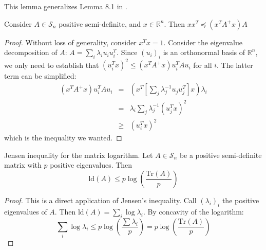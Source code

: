 This lemma generalizes Lemma 8.1 in \cite{Spielman2009a}.
\begin{lemma}
\label{lem:simple-inequality}Consider $A\in\mathcal{S}_{n}$ positive
semi-definite, and $x\in\mathbb{R}^{n}$. Then $xx^{T}\preceq\left(x^{T}A^{+}x\right)A$\end{lemma}
\begin{proof}
Without loss of generality, consider $x^{T}x=1$. Consider the eigenvalue
decomposition of $A$: $A=\sum_{i}\lambda_{i}u_{i}u_{i}^{T}$. Since
$\left(u_{i}\right)_{i}$ is an orthonormal basis of $\mathbb{R}^{n}$,
we only need to establish that $\left(u_{i}^{T}x\right)^{2}\leq\left(x^{T}A^{+}x\right)u_{i}^{T}Au_{i}$
for all $i$. The latter term can be simplified: 
\begin{eqnarray*}
\left(x^{T}A^{+}x\right)u_{i}^{T}Au_{i} & = & \left(x^{T}\left[\sum_{j}\lambda_{j}^{-1}u_{j}u_{j}^{T}\right]x\right)\lambda_{i}\\
 & = & \lambda_{i}\sum_{j}\lambda_{j}^{-1}\left(u_{j}^{T}x\right)^{2}\\
 & \geq & \left(u_{i}^{T}x\right)^{2}
\end{eqnarray*}
which is the inequality we wanted.\end{proof}
\begin{lemma}
\label{lem:Jensen-inequality-matrix-logarithm-1}Jensen inequality
for the matrix logarithm. Let $A\in\mathcal{S}_{n}$ be a positive
semi-definite matrix with $p$ positive eigenvalues. Then 
\[
\text{ld}\left(A\right)\leq p\log\left(\frac{\text{Tr}\left(A\right)}{p}\right)
\]
\end{lemma}
\begin{proof}
This is a direct application of Jensen's inequality. Call $\left(\lambda_{i}\right)_{i}$
the positive eigenvalues of $A$. Then $\text{ld}\left(A\right)=\sum_{i}\log\lambda_{i}$.
By concavity of the logarithm: 
\[
\sum_{i}\log\lambda_{i}\leq p\log\left(\frac{\sum\lambda_{i}}{p}\right)=p\log\left(\frac{\text{Tr}\left(A\right)}{p}\right)
\]
\end{proof}

